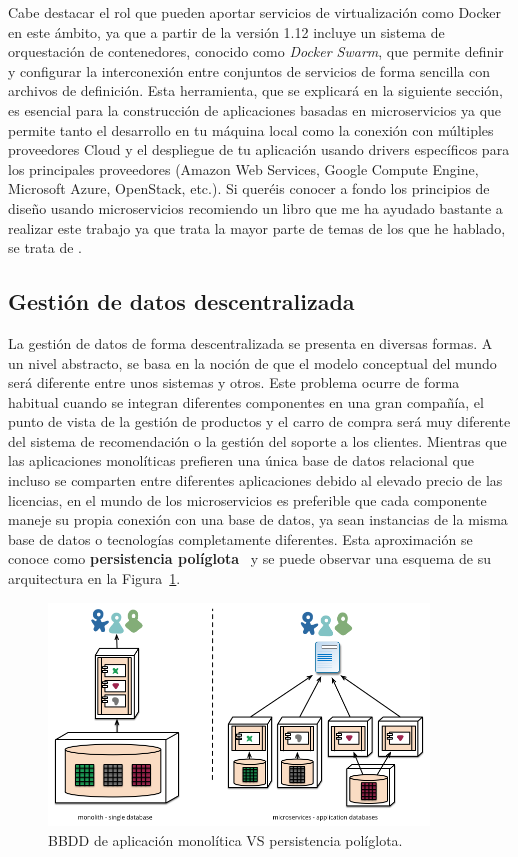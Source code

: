 Cabe destacar el rol que pueden aportar servicios de virtualización como Docker en este ámbito, ya que a partir de la versión 1.12 incluye un sistema de orquestación de contenedores, conocido como \emph{Docker Swarm}, que permite definir y configurar la interconexión entre conjuntos de servicios de forma sencilla con archivos de definición. Esta herramienta, que se explicará en la siguiente sección, es esencial para la construcción de aplicaciones basadas en microservicios ya que permite tanto el desarrollo en tu máquina local como la conexión con múltiples proveedores Cloud y el despliegue de tu aplicación usando drivers específicos para los principales proveedores (Amazon Web Services, Google Compute Engine, Microsoft Azure, OpenStack, etc.). Si queréis conocer a fondo los principios de diseño usando microservicios recomiendo un libro que me ha ayudado bastante a realizar este trabajo ya que trata la mayor parte de temas de los que he hablado, se trata de \cite{microbook}.

\subsection{Gestión de datos descentralizada}\label{sec:poly}

La gestión de datos de forma descentralizada se presenta en diversas formas. A un nivel abstracto, se basa en la noción de que el modelo conceptual del mundo será diferente entre unos sistemas y otros. Este problema ocurre de forma habitual cuando se integran diferentes componentes en una gran compañía, el punto de vista de la gestión de productos y el carro de compra será muy diferente del sistema de recomendación o la gestión del soporte a los clientes. Mientras que las aplicaciones monolíticas prefieren una única base de datos relacional que incluso se comparten entre diferentes aplicaciones debido al elevado precio de las licencias, en el mundo de los microservicios es preferible que cada componente maneje su propia conexión con una base de datos, ya sean instancias de la misma base de datos o tecnologías completamente diferentes. Esta aproximación se conoce como \textbf{persistencia políglota}~\cite{poly} y se puede observar una esquema de su arquitectura en la Figura~\ref{fig:polyglot}.

\begin{figure}
\centering
\includegraphics[width=0.9\textwidth]{decentralised-data.png}
\caption{\label{fig:polyglot}BBDD de aplicación monolítica VS persistencia políglota.}
\end{figure}

